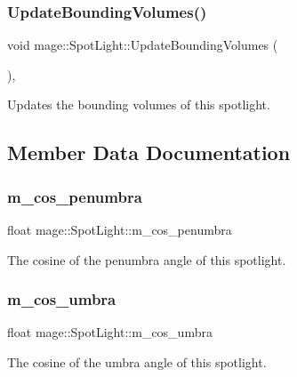 \subsubsection{\texorpdfstring{Update\+Bounding\+Volumes()}{UpdateBoundingVolumes()}}
{\footnotesize\ttfamily void mage\+::\+Spot\+Light\+::\+Update\+Bounding\+Volumes (\begin{DoxyParamCaption}{ }\end{DoxyParamCaption})\hspace{0.3cm}{\ttfamily [private]}, {\ttfamily [noexcept]}}

Updates the bounding volumes of this spotlight. 

\subsection{Member Data Documentation}
\hypertarget{classmage_1_1_spot_light_ac5d9f3426397abff72c5098b6e7e8472}{}\label{classmage_1_1_spot_light_ac5d9f3426397abff72c5098b6e7e8472} 
\subsubsection{\texorpdfstring{m\+\_\+cos\+\_\+penumbra}{m\_cos\_penumbra}}
{\footnotesize\ttfamily float mage\+::\+Spot\+Light\+::m\+\_\+cos\+\_\+penumbra\hspace{0.3cm}{\ttfamily [private]}}

The cosine of the penumbra angle of this spotlight. \hypertarget{classmage_1_1_spot_light_a9afab31514f93d702f9e516491f262f2}{}\label{classmage_1_1_spot_light_a9afab31514f93d702f9e516491f262f2} 
\subsubsection{\texorpdfstring{m\+\_\+cos\+\_\+umbra}{m\_cos\_umbra}}
{\footnotesize\ttfamily float mage\+::\+Spot\+Light\+::m\+\_\+cos\+\_\+umbra\hspace{0.3cm}{\ttfamily [private]}}

The cosine of the umbra angle of this spotlight. \hypertarget{classmage_1_1_spot_light_a8e0616e3a36d1a05d800cc4a43739178}{}\label{classmage_1_1_spot_light_a8e0616e3a36d1a05d800cc4a43739178} 
